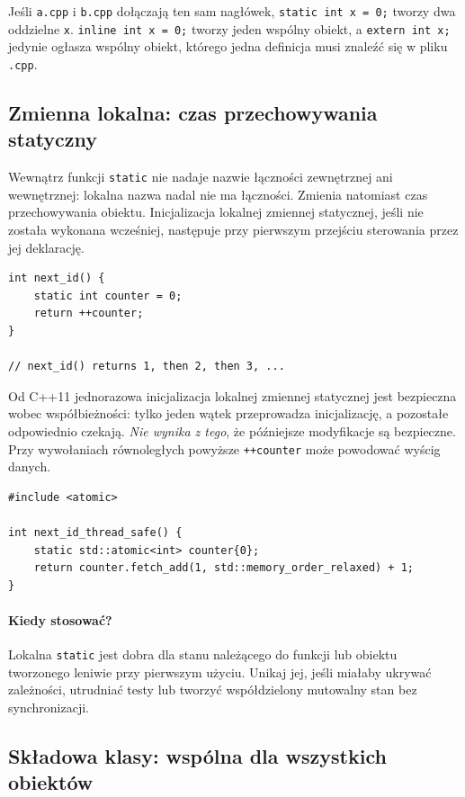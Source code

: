 Jeśli \texttt{a.cpp} i \texttt{b.cpp} dołączają ten sam nagłówek,
\texttt{static int x = 0;} tworzy dwa oddzielne \texttt{x}.
\texttt{inline int x = 0;} tworzy jeden wspólny obiekt, a
\texttt{extern int x;} jedynie ogłasza wspólny obiekt, którego
jedna definicja musi znaleźć się w pliku \texttt{.cpp}.

\subsection{Zmienna lokalna: czas przechowywania statyczny}

Wewnątrz funkcji \texttt{static} nie nadaje nazwie łączności zewnętrznej
ani wewnętrznej: lokalna nazwa nadal nie ma łączności. Zmienia natomiast
czas przechowywania obiektu. Inicjalizacja lokalnej zmiennej statycznej,
jeśli nie została wykonana wcześniej, następuje przy pierwszym przejściu
sterowania przez jej deklarację.

\begin{lstlisting}
int next_id() {
    static int counter = 0;
    return ++counter;
}

// next_id() returns 1, then 2, then 3, ...
\end{lstlisting}

Od C++11 jednorazowa inicjalizacja lokalnej zmiennej statycznej jest
bezpieczna wobec współbieżności: tylko jeden wątek przeprowadza
inicjalizację, a pozostałe odpowiednio czekają. \emph{Nie wynika z tego},
że późniejsze modyfikacje są bezpieczne. Przy wywołaniach równoległych
powyższe \texttt{++counter} może powodować wyścig danych.

\begin{lstlisting}
#include <atomic>

int next_id_thread_safe() {
    static std::atomic<int> counter{0};
    return counter.fetch_add(1, std::memory_order_relaxed) + 1;
}
\end{lstlisting}

\paragraph{Kiedy stosować?}
Lokalna \texttt{static} jest dobra dla stanu należącego do funkcji
lub obiektu tworzonego leniwie przy pierwszym użyciu. Unikaj jej,
jeśli miałaby ukrywać zależności, utrudniać testy lub tworzyć
współdzielony mutowalny stan bez synchronizacji.

\subsection{Składowa klasy: wspólna dla wszystkich obiektów}

